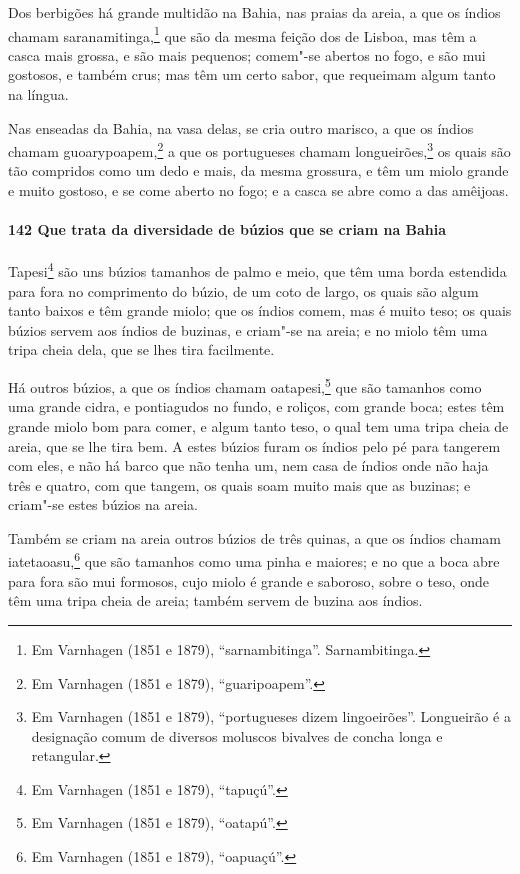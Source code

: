 Dos berbigões há grande multidão na Bahia, nas praias da areia, a que os índios chamam
saranamitinga,\footnote{ Em Varnhagen (1851 e 1879), ``sarnambitinga''. Sarnambitinga.}
que são da mesma feição dos de Lisboa, mas têm a casca mais grossa, e são mais pequenos;
comem"-se abertos no fogo, e são mui gostosos, e também crus; mas têm um certo sabor, que
requeimam algum tanto na língua.

Nas enseadas da Bahia, na vasa delas, se cria outro marisco, a que os índios chamam
guoarypoapem,\footnote{ Em Varnhagen (1851 e 1879), ``guaripoapem''.} a que os portugueses
chamam longueirões,\footnote{ Em Varnhagen (1851 e 1879), ``portugueses dizem
lingoeirões''. Longueirão é a designação comum de diversos moluscos bivalves de concha
longa e retangular.} os quais são tão compridos como um dedo e mais, da mesma grossura, e
têm um miolo grande e muito gostoso, e se come aberto no fogo; e a casca se abre como a
das amêijoas.

\paragraph{142 Que trata da diversidade de búzios que se criam na Bahia}

Tapesi\footnote{ Em Varnhagen (1851 e 1879), ``tapuçú''.} são uns búzios tamanhos de palmo
e meio, que têm uma borda estendida para fora no comprimento do búzio, de um coto de
largo, os quais são algum tanto baixos e têm grande miolo; que os índios comem, mas é
muito teso; os quais búzios servem aos índios de buzinas, e criam"-se na areia; e no miolo
têm uma tripa cheia dela, que se lhes tira facilmente.

Há outros búzios, a que os índios chamam oatapesi,\footnote{ Em Varnhagen (1851 e 1879),
``oatapú''.} que são tamanhos como uma grande cidra, e pontiagudos no fundo, e roliços,
com grande boca; estes têm grande miolo bom para comer, e algum tanto teso, o qual tem uma
tripa cheia de areia, que se lhe tira bem. A estes búzios furam os índios pelo pé para
tangerem com eles, e não há barco que não tenha um, nem casa de índios onde não haja três
e quatro, com que tangem, os quais soam muito mais que as buzinas; e criam"-se estes búzios
na areia.

Também se criam na areia outros búzios de três quinas, a que os índios chamam
iatetaoasu,\footnote{ Em Varnhagen (1851 e 1879), ``oapuaçú''.} que são tamanhos como uma
pinha e maiores; e no que a boca abre para fora são mui formosos, cujo miolo é grande e
saboroso, sobre o teso, onde têm uma tripa cheia de areia; também servem de buzina aos
índios.

